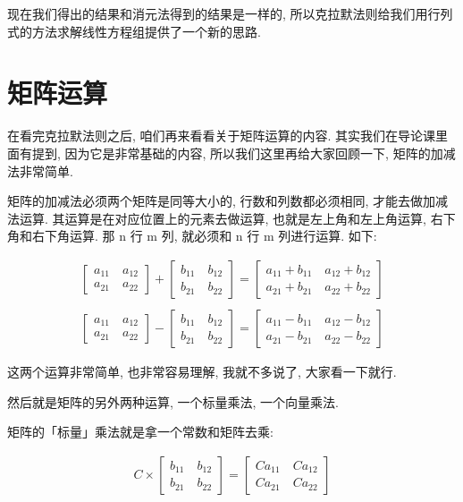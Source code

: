 现在我们得出的结果和消元法得到的结果是一样的, 所以克拉默法则给我们用行列式的方法求解线性方程组提供了一个新的思路. 

\section{矩阵运算}

在看完克拉默法则之后, 咱们再来看看关于矩阵运算的内容. 其实我们在导论课里面有提到, 因为它是非常基础的内容, 所以我们这里再给大家回顾一下, 矩阵的加减法非常简单. 

矩阵的加减法必须两个矩阵是同等大小的, 行数和列数都必须相同, 才能去做加减法运算. 其运算是在对应位置上的元素去做运算, 也就是左上角和左上角运算, 右下角和右下角运算. 那 n 行 m 列, 就必须和 n 行 m 列进行运算. 如下: 

\begin{align*}
\begin{bmatrix}
a_{11} \quad a_{12} \\
a_{21} \quad a_{22}
\end{bmatrix}
+
\begin{bmatrix}
b_{11} \quad b_{12} \\
b_{21} \quad b_{22}
\end{bmatrix}=
\begin{bmatrix}
a_{11} + b_{11} \quad a_{12} + b_{12} \\
a_{21} + b_{21} \quad a_{22} + b_{22}
\end{bmatrix} \\ \\
\begin{bmatrix}
a_{11} \quad a_{12} \\
a_{21} \quad a_{22}
\end{bmatrix}
-
\begin{bmatrix}
b_{11} \quad b_{12} \\
b_{21} \quad b_{22}
\end{bmatrix}=
\begin{bmatrix}
a_{11} - b_{11} \quad a_{12} - b_{12} \\
a_{21} - b_{21} \quad a_{22} - b_{22}
\end{bmatrix}
\end{align*}

这两个运算非常简单, 也非常容易理解, 我就不多说了, 大家看一下就行. 

然后就是矩阵的另外两种运算, 一个标量乘法, 一个向量乘法. 

矩阵的「标量」乘法就是拿一个常数和矩阵去乘: 

\begin{align*}
C \times
\begin{bmatrix}
b_{11} \quad b_{12} \\
b_{21} \quad b_{22}
\end{bmatrix}=
\begin{bmatrix}
Ca_{11} \quad Ca_{12} \\
Ca_{21} \quad Ca_{22}
\end{bmatrix}
\end{align*}

